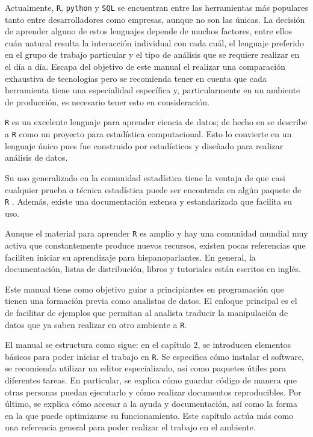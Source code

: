 \documentclass[]{article}
\begin{document}
Actualmente, \texttt{R}, \texttt{python} y \texttt{SQL} se encuentran
entre las herramientas más populares tanto entre desarrolladores como
empresas, aunque no son las únicas. La decisión de aprender alguno de
estos lenguajes depende de muchos factores, entre ellos cuán natural
resulta la interacción individual con cada cuál, el lenguaje preferido
en el grupo de trabajo particular y el tipo de análisis que se requiere
realizar en el día a día. Escapa del objetivo de este manual el realizar
una comparación exhaustiva de tecnologías pero se recomienda tener en
cuenta que cada herramienta tiene una especialidad específica y,
particularmente en un ambiente de producción, es necesario tener esto en
consideración.

\texttt{R} es un excelente lenguaje para aprender ciencia de datos; de
hecho en \textcite{cran} se describe a \texttt{R} como un proyecto para
estadística computacional. Esto lo convierte en un lenguaje único pues
fue construido por estadísticos y diseñado para realizar análisis de
datos.

Su uso generalizado en la comunidad estadística tiene la ventaja de que
casi cualquier prueba o técnica estadística puede ser encontrada en
algún paquete de \texttt{R} \parencite{recommendr}. Además, existe una
documentación extensa y estandarizada que facilita su uso.

Aunque el material para aprender \texttt{R} es amplio y hay una
comunidad mundial muy activa que constantemente produce nuevos recursos,
existen pocas referencias que faciliten iniciar su aprendizaje para
hispanoparlantes. En general, la documentación, listas de distribución,
libros y tutoriales están escritos en inglés.

Este manual tiene como objetivo guiar a principiantes en programación
que tienen una formación previa como analistas de datos. El enfoque
principal es el de facilitar de ejemplos que permitan al analista
traducir la manipulación de datos que ya saben realizar en otro ambiente
a \texttt{R}.

El manual se estructura como sigue: en el capítulo 2, se introducen
elementos básicos para poder iniciar el trabajo en \texttt{R}. Se
especifica cómo instalar el software, se recomienda utilizar un editor
especializado, así como paquetes útiles para diferentes tareas. En
particular, se explica cómo guardar código de manera que otras personas
puedan ejecutarlo y cómo realizar documentos reproducibles. Por último,
se explica cómo accesar a la ayuda y documentación, así como la forma en
la que puede optimizarse su funcionamiento. Este capítulo actúa más como
una referencia general para poder realizar el trabajo en el ambiente.
\end{document}
